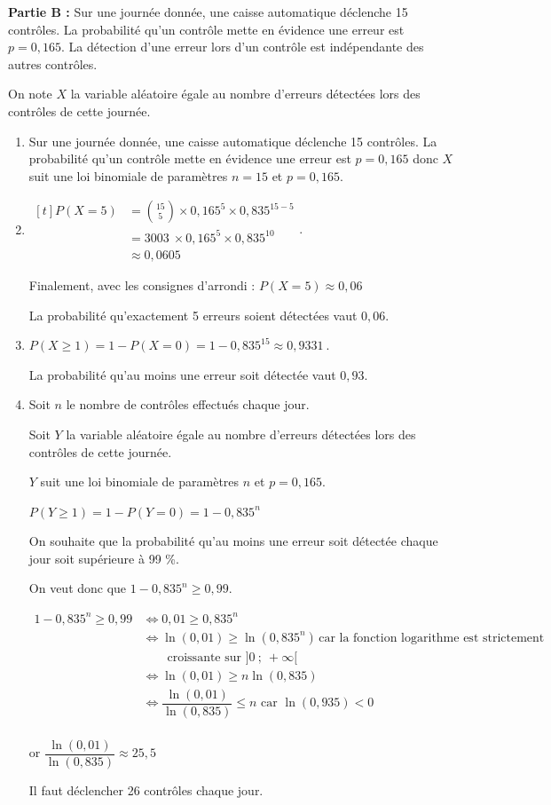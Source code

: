\documentclass[10pt]{article}
\providecommand{\np}[2][]{{#2~#1}}
\begin{document}
\textbf{Partie B :}
Sur une journée donnée, une caisse automatique déclenche 15 contrôles. La probabilité qu'un contrôle mette en évidence une erreur est $p=0,165$. La détection d'une erreur lors d'un contrôle est indépendante des autres contrôles.

On note $X$ la variable aléatoire égale au nombre d'erreurs détectées lors des contrôles de cette journée.

\begin{enumerate}
\item Sur une journée donnée, une caisse automatique déclenche 15 contrôles. La probabilité qu'un contrôle mette en évidence une erreur est $p=0,165$ donc $X$ suit une loi binomiale de paramètres $n=15$ et $p=0,165$. 
\item $\begin{aligned}[t] P\left(X=5\right)
& = \displaystyle \binom{15}{5}\times 0,165^{5}\times 0,835^{15 - 5}\\
& = \np{3003}\times 0,165^{5} \times 0,835^{10} \\
& \approx \np{0,0605}
\end{aligned}$.

Finalement, avec les consignes d'arrondi : \quad $P\left(X=5\right) \approx 0,06$

La probabilité qu'exactement 5 erreurs soient détectées vaut $0,06$.

\item  $P(X\geqslant 1)=1-P(X=0)= 1- 0,835^
{15} \approx \np{0,9331}$.

La probabilité qu'au moins une erreur soit détectée vaut $0,93$.

\item Soit $n$ le nombre de contrôles effectués chaque jour.

Soit $Y$ la variable aléatoire égale au nombre d'erreurs détectées lors des contrôles de cette journée.

$Y$ suit une loi binomiale de paramètres $n$ et $p=0,165$.

$P(Y\geqslant 1)=1-P(Y=0)= 1- 0,835^n$

On souhaite que la probabilité qu'au moins une erreur soit détectée chaque jour soit supérieure à 99 \%.

On veut donc que $1- 0,835^n \geqslant 0,99$.

$\begin{aligned} 1- 0,835^n \geqslant 0,99 & \iff 0,01 \geqslant 0,835^n\\
& \iff \ln(0,01)\geqslant \ln \left(0,835^n\right) \, \text{car la fonction logarithme est strictement}\\
& \qquad \text{croissante sur } ]0~;~+\infty[\\
 &\iff \ln (0,01)\geqslant n \ln \left(0,835\right)\\
& \iff \dfrac{\ln(0,01)}{\ln(0,835)} \leqslant n \text{ car } \ln(0,935)<0\\
\end{aligned}$

or $ \dfrac{\ln(0,01)}{\ln(0,835)} \approx 25,5$

Il faut déclencher 26 contrôles chaque jour.
\end{enumerate}
\end{document}
